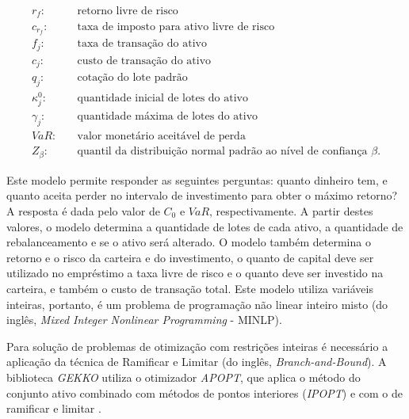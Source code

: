         \begin{equation*}
            \begin{aligned}
                r_{f} : \quad & \text{retorno livre de risco} \\
                c_{r_{f}} : \quad & \text{taxa de imposto para ativo livre de risco} \\
                f_{j} : \quad & \text{taxa de transação do ativo} \\
                c_{j} : \quad & \text{custo de transação do ativo} \\
                q_{j} : \quad & \text{cotação do lote padrão} \\
                \kappa_{j}^{0} : \quad & \text{quantidade inicial de lotes do ativo} \\
                \gamma_{j} : \quad & \text{quantidade máxima de lotes do ativo} \\
                VaR : \quad & \text{valor monetário aceitável de perda} \\
                Z_{\beta} : \quad & \text{quantil da distribuição normal padrão ao nível de confiança }\beta.
            \end{aligned}
        \end{equation*}

        \ipar Este modelo permite responder as seguintes perguntas: quanto dinheiro tem, e quanto aceita perder no intervalo de investimento para obter o máximo retorno? A resposta é dada pelo valor de $C_{0}$ e $VaR$, respectivamente. A partir destes valores, o modelo determina a quantidade de lotes de cada ativo, a quantidade de rebalanceamento e se o ativo será alterado. O modelo também determina o retorno e o risco da carteira e do investimento, o quanto de capital deve ser utilizado no empréstimo a taxa livre de risco e o quanto deve ser investido na carteira, e também o custo de transação total. Este modelo utiliza variáveis inteiras, portanto, é um problema de programação não linear inteiro misto (do inglês, \textit{Mixed Integer Nonlinear Programming} - MINLP).
        
        \ipar Para solução de problemas de otimização com restrições inteiras é necessário a aplicação da técnica de Ramificar e Limitar (do inglês, \textit{Branch-and-Bound}). A biblioteca \textit{GEKKO} utiliza o otimizador \textit{APOPT}, que aplica o método do conjunto ativo combinado com métodos de pontos interiores (\textit{IPOPT}) e com o de ramificar e limitar \cite{hedengren2014nonlinear}.

